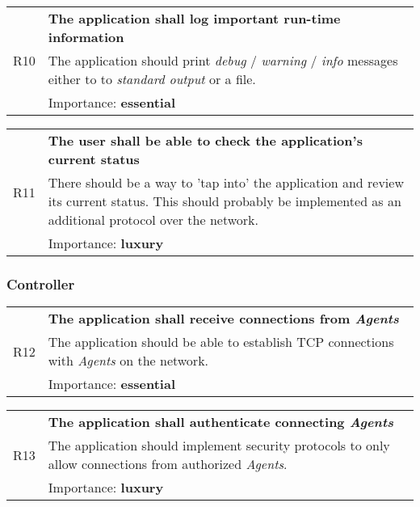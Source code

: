             \vspace{0.5cm}
            \noindent
            \begin{tabular}{ p{0.7cm}|p{14.5cm} }
                \multirow{3}{*}{R10} & \textbf{The application shall log important run-time information}\\
                \cline{2-2}
                & The application should print \textit{debug} / \textit{warning} / \textit{info} messages either to to \textit{standard output} or a file.\\
                \cline{2-2}
                & Importance: \textbf{essential}
            \end{tabular}

            \vspace{0.5cm}
            \noindent
            \begin{tabular}{ p{0.7cm}|p{14.5cm} }
                \multirow{3}{*}{R11} & \textbf{The user shall be able to check the application's current status}\\
                \cline{2-2}
                & There should be a way to 'tap into' the application and review its current status. This should probably be implemented as an additional protocol over the network.\\
                \cline{2-2}
                & Importance: \textbf{luxury}
            \end{tabular}


        \subsubsection{Controller}
            \begin{tabular}{ p{0.7cm}|p{14.5cm} }
                \multirow{3}{*}{R12} & \textbf{The application shall receive connections from \textit{Agents}}\\
                \cline{2-2}
                & The application should be able to establish TCP connections with \textit{Agents} on the network.\\
                \cline{2-2}
                & Importance: \textbf{essential}
            \end{tabular}

            \vspace{0.5cm}
            \noindent
            \begin{tabular}{ p{0.7cm}|p{14.5cm} }
                \multirow{3}{*}{R13} & \textbf{The application shall authenticate connecting \textit{Agents}}\\
                \cline{2-2}
                & The application should implement security protocols to only allow connections from authorized \textit{Agents}.\\
                \cline{2-2}
                & Importance: \textbf{luxury}
            \end{tabular}

